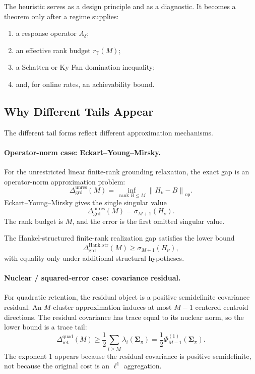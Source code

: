 \documentclass[12pt]{article}
\theoremstyle{definition}
\DeclareMathOperator{\rank}{rank}
\newcommand{\norm}[1]{\left\lVert#1\right\rVert}
\newcommand{\Dunres}{\Delta_{\mathrm{grd}}^{\mathrm{unres}}}
\newcommand{\DHankstr}{\Delta_{\mathrm{grd}}^{\mathrm{Hank,str}}}
\begin{document}
The heuristic serves as a design principle and as a diagnostic.  It becomes a
theorem only after a regime supplies:
\begin{enumerate}[label=(\arabic*)]
\item a response operator $A_\delta$;
\item an effective rank budget $r_{\mathbb T}(M)$;
\item a Schatten or Ky Fan domination inequality;
\item and, for online rates, an achievability bound.
\end{enumerate}

\subsection{Why Different Tails Appear}
\label{subsec:spectral-why}

The different tail forms reflect different approximation mechanisms.

\paragraph{Operator-norm case: Eckart--Young--Mirsky.}
For the unrestricted linear finite-rank grounding relaxation, the exact gap is
an operator-norm approximation problem:
\[
\Dunres(M)
=
\inf_{\rank B\le M}
\norm{H_\nu-B}_{\mathrm{op}}.
\]
Eckart--Young--Mirsky gives the single singular value
\[
\Dunres(M)
=
\sigma_{M+1}(H_\nu).
\]
The rank budget is $M$, and the error is the first omitted singular value.

The Hankel-structured finite-rank realization gap satisfies the lower bound
\[
\DHankstr(M)
\ge
\sigma_{M+1}(H_\nu),
\]
with equality only under additional structural hypotheses.

\paragraph{Nuclear / squared-error case: covariance residual.}
For quadratic retention, the residual object is a positive semidefinite
covariance residual.  An $M$-cluster approximation induces at most $M-1$
centered centroid directions.  The residual covariance has trace equal to its
nuclear norm, so the lower bound is a trace tail:
\[
\Delta_{\mathrm{ret}}^{\mathrm{quad}}(M)
\ge
\frac12
\sum_{i\ge M}
\lambda_i(\bm{\Sigma}_\pi)
=
\frac12
\Phi^{(1)}_{M-1}(\bm{\Sigma}_\pi).
\]
The exponent $1$ appears because the residual covariance is positive
semidefinite, not because the original cost is an $\ell^1$ aggregation.
\end{document}
